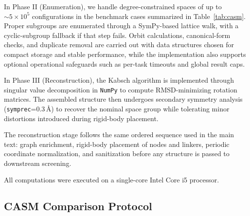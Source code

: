 \documentclass[pdflatex,sn-mathphys-num]{sn-jnl}
\theoremstyle{thmstyleone}%
\begin{document}
In Phase II (Enumeration), we handle degree-constrained spaces of up to $\sim\!5\times10^{5}$ configurations in the benchmark cases summarized in Table~\ref{tab:casm}. Proper subgroups are enumerated through a SymPy-based lattice walk, with a cyclic-subgroup fallback if that step fails. Orbit calculations, canonical-form checks, and duplicate removal are carried out with data structures chosen for compact storage and stable performance, while the implementation also supports optional operational safeguards such as per-task timeouts and global result caps.

In Phase III (Reconstruction), the Kabsch algorithm is implemented through singular value decomposition in \texttt{NumPy} to compute RMSD-minimizing rotation matrices. The assembled structure then undergoes secondary symmetry analysis (\texttt{symprec}=0.3\,\AA) to recover the nominal space group while tolerating minor distortions introduced during rigid-body placement.

The reconstruction stage follows the same ordered sequence used in the main text: graph enrichment, rigid-body placement of nodes and linkers, periodic coordinate normalization, and sanitization before any structure is passed to downstream screening.

All computations were executed on a single-core Intel Core i5 processor.

\subsection*{CASM Comparison Protocol}
\end{document}
